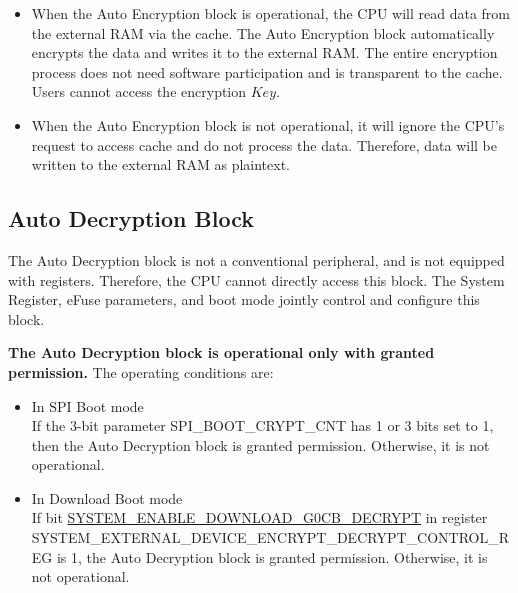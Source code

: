 \documentclass[main\_\_EN.tex]{subfiles}
\begin{document}
\begin{tiplisting}
\vspace{-2em}
\begin{itemize}

\item When the Auto Encryption block is operational, the CPU will read data from the external RAM via the cache. The Auto Encryption block automatically encrypts the data and writes it to the external RAM. The entire encryption process does not need software participation and is transparent to the cache. Users cannot access the encryption \begin{math}Key\end{math}.

\item When the Auto Encryption block is not operational, it will ignore the CPU's request to access cache and do not process the data. Therefore, data will be written to the external RAM as plaintext.

\end{itemize}
\end{tiplisting}

\subsection{Auto Decryption Block}
The Auto Decryption block is not a conventional peripheral, and is not equipped with registers. Therefore, the CPU cannot directly access this block. The System Register, eFuse parameters, and boot mode jointly control and configure this block.

\textbf{The Auto Decryption block is operational only with granted permission.} The operating conditions are:

\begin{itemize}
    \item In SPI Boot mode\\
If the 3-bit parameter SPI\_BOOT\_CRYPT\_CNT has 1 or 3 bits set to 1, then the Auto Decryption block is granted permission. Otherwise, it is not operational.

    \item In Download Boot mode\\
If bit \hyperref[fielddesc:SYSTEMENABLEDOWNLOADG0CBDECRYPT]{SYSTEM\_ENABLE\_DOWNLOAD\_G0CB\_DECRYPT} in register\\ SYSTEM\_EXTERNAL\_DEVICE\_ENCRYPT\_DECRYPT\_CONTROL\_REG is 1, the Auto Decryption block is granted permission. Otherwise, it is not operational.
\end{itemize}
\end{document}
